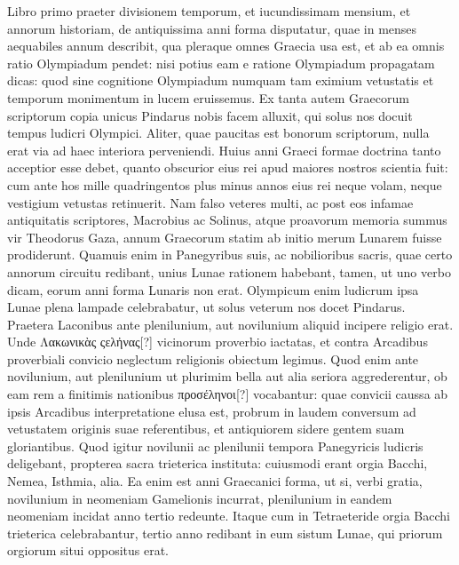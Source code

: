 Libro primo
praeter divisionem temporum, et iucundissimam mensium, et
annorum historiam, de antiquissima anni forma disputatur, quae in
menses aequabiles annum describit, qua pleraque omnes Graecia usa
est, et ab ea omnis ratio Olympiadum pendet: nisi potius eam e ratione
Olympiadum propagatam dicas: quod sine cognitione Olympiadum
numquam tam eximium vetustatis et temporum monimentum
in lucem eruissemus. 
Ex tanta autem Graecorum scriptorum
copia unicus Pindarus nobis facem alluxit, qui solus nos docuit tempus
ludicri Olympici.
Aliter, quae paucitas est bonorum scriptorum,
nulla erat via ad haec interiora perveniendi.
Huius anni Graeci
formae doctrina tanto acceptior esse debet, quanto obscurior eius
rei apud maiores nostros scientia fuit: cum ante hos mille quadringentos
plus minus annos eius rei neque volam, neque vestigium
vetustas retinuerit.
Nam falso veteres multi, ac post eos infamae antiquitatis
scriptores, Macrobius ac Solinus, atque proavorum memoria
summus vir Theodorus Gaza, annum Graecorum statim
ab initio merum Lunarem fuisse prodiderunt.
%
Quamuis enim in
Panegyribus suis, ac nobilioribus sacris, quae certo annorum circuitu
redibant, unius Lunae rationem habebant, tamen, ut uno verbo
dicam, eorum anni forma Lunaris non erat.
Olympicum enim ludicrum
ipsa Lunae plena lampade celebrabatur, ut solus veterum nos
docet Pindarus. 
Praetera Laconibus ante plenilunium, aut novilunium
aliquid incipere religio erat.
Unde \textgreek{Λακωνικὰς ςελἠνας}[?] vicinorum
proverbio iactatas, et contra Arcadibus proverbiali convicio
neglectum religionis obiectum legimus. 
Quod enim ante novilunium,
aut plenilunium ut plurimim bella aut alia seriora aggrederentur,
ob eam rem a finitimis nationibus \textgreek{προσέληνοι[?]} vocabantur:
quae convicii caussa ab ipsis Arcadibus interpretatione elusa est,
probrum in laudem conversum ad vetustatem originis suae referentibus,
et antiquiorem sidere gentem suam gloriantibus. 
Quod igitur
novilunii ac plenilunii tempora Panegyricis ludicris deligebant,
propterea sacra trieterica instituta: cuiusmodi erant orgia Bacchi,
Nemea, Isthmia, alia.
Ea enim est anni Graecanici forma, ut si, verbi
gratia, novilunium in neomeniam Gamelionis incurrat, plenilunium
in eandem neomeniam incidat anno tertio redeunte.
Itaque
cum in Tetraeteride orgia Bacchi trieterica celebrabantur, tertio
anno redibant in eum sistum Lunae, qui priorum orgiorum situi oppositus
erat.
